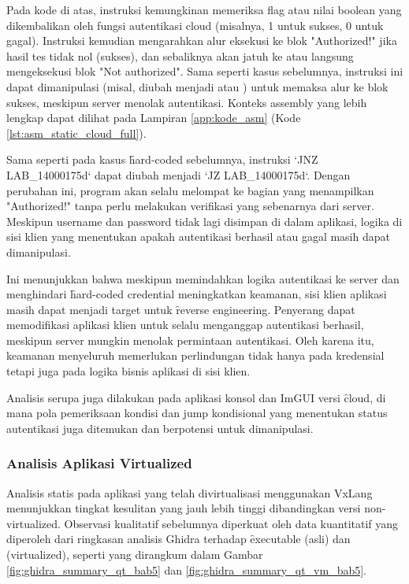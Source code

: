 Pada kode di atas, instruksi  kemungkinan memeriksa flag atau nilai boolean yang dikembalikan oleh fungsi autentikasi cloud (misalnya, 1 untuk sukses, 0 untuk gagal). Instruksi  kemudian mengarahkan alur eksekusi ke blok "Authorized!" jika hasil tes tidak nol (sukses), dan sebaliknya akan jatuh ke  atau langsung mengeksekusi blok "Not authorized". Sama seperti kasus sebelumnya, instruksi  ini dapat dimanipulasi (misal, diubah menjadi  atau ) untuk memaksa alur ke blok sukses, meskipun server menolak autentikasi. Konteks assembly yang lebih lengkap dapat dilihat pada Lampiran \ref{app:kode_asm} (Kode \ref{lst:asm_static_cloud_full}).

Sama seperti pada kasus \f{hard-coded} sebelumnya, instruksi `JNZ LAB\_14000175d` dapat diubah menjadi `JZ LAB\_14000175d`. Dengan perubahan ini, program akan selalu melompat ke bagian yang menampilkan "Authorized!" tanpa perlu melakukan verifikasi yang sebenarnya dari server. Meskipun username dan password tidak lagi disimpan di dalam aplikasi, logika di sisi klien yang menentukan apakah autentikasi berhasil atau gagal masih dapat dimanipulasi.

Ini menunjukkan bahwa meskipun memindahkan logika autentikasi ke server dan menghindari \f{hard-coded credential} meningkatkan keamanan, sisi klien aplikasi masih dapat menjadi target untuk \f{reverse engineering}. Penyerang dapat memodifikasi aplikasi klien untuk selalu menganggap autentikasi berhasil, meskipun server mungkin menolak permintaan autentikasi. Oleh karena itu, keamanan menyeluruh memerlukan perlindungan tidak hanya pada kredensial tetapi juga pada logika bisnis aplikasi di sisi klien.

Analisis serupa juga dilakukan pada aplikasi konsol dan ImGUI versi \f{cloud}, di mana pola pemeriksaan kondisi dan jump kondisional yang menentukan status autentikasi juga ditemukan dan berpotensi untuk dimanipulasi.

\subsubsection{Analisis Aplikasi Virtualized}

Analisis statis pada aplikasi yang telah divirtualisasi menggunakan VxLang menunjukkan tingkat kesulitan yang jauh lebih tinggi dibandingkan versi non-virtualized. Observasi kualitatif sebelumnya diperkuat oleh data kuantitatif yang diperoleh dari ringkasan analisis Ghidra terhadap \f{executable}  (asli) dan  (virtualized), seperti yang dirangkum dalam Gambar \ref{fig:ghidra_summary_qt_bab5} dan \ref{fig:ghidra_summary_qt_vm_bab5}.

